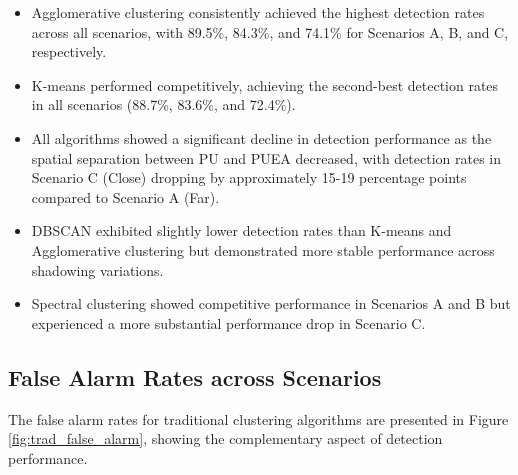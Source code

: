 \begin{itemize}
    \item Agglomerative clustering consistently achieved the highest detection rates across all scenarios, with 89.5\%, 84.3\%, and 74.1\% for Scenarios A, B, and C, respectively.
    
    \item K-means performed competitively, achieving the second-best detection rates in all scenarios (88.7\%, 83.6\%, and 72.4\%).
    
    \item All algorithms showed a significant decline in detection performance as the spatial separation between PU and PUEA decreased, with detection rates in Scenario C (Close) dropping by approximately 15-19 percentage points compared to Scenario A (Far).
    
    \item DBSCAN exhibited slightly lower detection rates than K-means and Agglomerative clustering but demonstrated more stable performance across shadowing variations.
    
    \item Spectral clustering showed competitive performance in Scenarios A and B but experienced a more substantial performance drop in Scenario C.
\end{itemize}

\subsection{False Alarm Rates across Scenarios}

The false alarm rates for traditional clustering algorithms are presented in Figure \ref{fig:trad_false_alarm}, showing the complementary aspect of detection performance.

